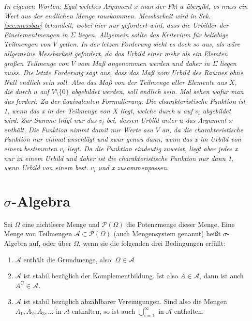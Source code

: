 \documentclass[paper=a4,10pt]{scrartcl}
\begin{document}
\noindent
\textit{In eigenen Worten: Egal welches Argument $x$ man der Fkt $u$ übergibt, es muss ein Wert aus der endlichen Menge rauskommen. Messbarkeit wird in Sek. \ref{sec:messbar} behandelt, wobei hier nur gefordert wird, dass die Urbilder der Einelementmengen in $\Sigma$ liegen. Allgemein sollte das Kriterium für beliebige Teilmengen von $V$ gelten. In der letzen Forderung sieht es doch so aus, als wäre allgemeine Messbarkeit gefordert, da das Urbild einer mehr als ein Elemten großen Teilmenge von $V$ vom Maß angenommen werden und daher in $\Sigma$ liegen muss. Die letzte Forderung sagt aus, dass das Maß vom Urbild des Raumes ohne Null endlich sein soll. Also das Maß von der Teilmenge aller Elemente aus $X$, die durch $u$ auf $V \setminus \{ 0\}$ abgebildet werden, soll endlich sein. Mal sehen wofür man das fordert. Zu der äquivalenten Formulierung: Die charakteristische Funktion ist 1, wenn das x in der Teilmenge von $X$ liegt, welche durch $u$ auf $v_i$ abgebildet wird. Zur Summe trägt nur das $v_i$ bei, dessen Urbild unter $u$ das Argument $x$ enthält. Die Funktion nimmt damit nur Werte asu $V$ an, da die charakteristische Funktion nur einmal anschlägt und zwar genau dann, wenn das x im Urbild von einem bestimmten $v_i$ liegt. Da die Funktion eindeutig zuweist, liegt aber jedes x nur in einem Urbild und daher ist die charakteristische Funktion nur dann 1, wenn Urbild von einem best. $v_i$ und x zusammenpassen.}

\section{$\sigma$-Algebra}
Sei $\Omega$ eine nichtleere Menge und $\mathcal{P}(\Omega)$ die Potenzmenge dieser Menge. Eine Menge von Teilmengen $\mathcal{A} \subset \mathcal{P}(\Omega)$ (auch Mengensystem genannt) heißt $\sigma$-Algebra auf, oder über $\Omega$, wenn sie die folgenden drei Bedingungen erfüllt:

\begin{enumerate}
	\item $\mathcal{A}$ enthält die Grundmenge, also: $\Omega \in \mathcal{A}$
	\item $\mathcal{A}$ ist stabil bezüglich der Komplementbildung. Ist also $A \in \mathcal{A}$, dann ist auch $A^{\mathrm{C}} \in \mathcal{A}$.
	\item $\mathcal{A}$ ist stabil bezüglich abzählbarer Vereinigungen. Sind also die Mengen $A_1, A_2, A_3, \dots$ in $\mathcal{A}$ enthalten, so ist auch $\bigcup^\infty_{i=1}$ in $\mathcal{A}$ enthalten.
\end{enumerate}
\end{document}
